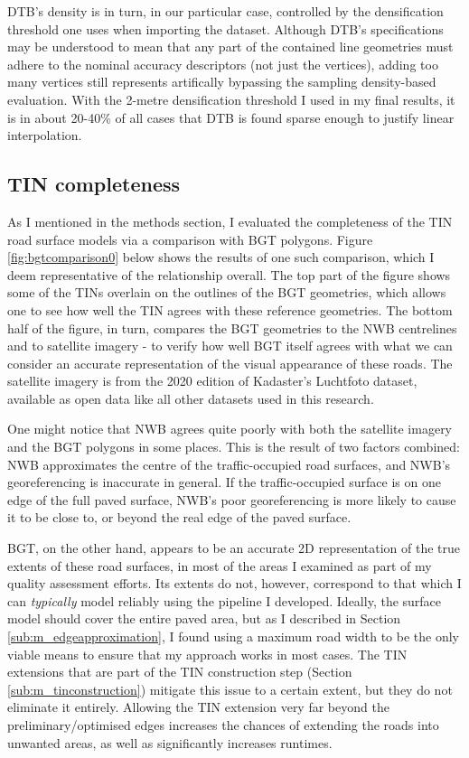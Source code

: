 DTB's density is in turn, in our particular case, controlled by the densification threshold one uses when importing the dataset. Although DTB's specifications may be understood to mean that any part of the contained line geometries must adhere to the nominal accuracy descriptors (not just the vertices), adding too many vertices still represents artifically bypassing the sampling density-based evaluation. With the 2-metre densification threshold I used in my final results, it is in about 20-40\% of all cases that DTB is found sparse enough to justify linear interpolation.

\subsection{TIN completeness}
\label{sub:tincompleteness}

As I mentioned in the methods section, I evaluated the completeness of the TIN road surface models via a comparison with BGT polygons. Figure \ref{fig:bgtcomparison0} below shows the results of one such comparison, which I deem representative of the relationship overall. The top part of the figure shows some of the TINs overlain on the outlines of the BGT geometries, which allows one to see how well the TIN agrees with these reference geometries. The bottom half of the figure, in turn, compares the BGT geometries to the NWB centrelines and to satellite imagery - to verify how well BGT itself agrees with what we can consider an accurate representation of the visual appearance of these roads. The satellite imagery is from the 2020 edition of Kadaster's Luchtfoto dataset, available as open data like all other datasets used in this research.

One might notice that NWB agrees quite poorly with both the satellite imagery and the BGT polygons in some places. This is the result of two factors combined: NWB approximates the centre of the traffic-occupied road surfaces, and NWB's georeferencing is inaccurate in general. If the traffic-occupied surface is on one edge of the full paved surface, NWB's poor georeferencing is more likely to cause it to be close to, or beyond the real edge of the paved surface.

BGT, on the other hand, appears to be an accurate 2D representation of the true extents of these road surfaces, in most of the areas I examined as part of my quality assessment efforts. Its extents do not, however, correspond to that which I can \textit{typically} model reliably using the pipeline I developed. Ideally, the surface model should cover the entire paved area, but as I described in Section \ref{sub:m_edgeapproximation}, I found using a maximum road width to be the only viable means to ensure that my approach works in most cases. The TIN extensions that are part of the TIN construction step (Section \ref{sub:m_tinconstruction}) mitigate this issue to a certain extent, but they do not eliminate it entirely. Allowing the TIN extension very far beyond the preliminary/optimised edges increases the chances of extending the roads into unwanted areas, as well as significantly increases runtimes.

